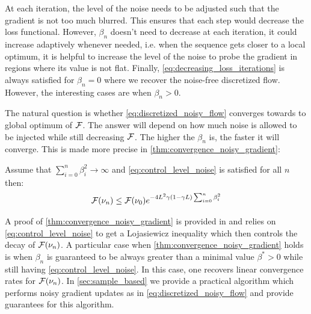 \begin{remark}
	At each iteration, the level of the noise needs to be adjusted such that the gradient is not too much blurred. This ensures that each step would decrease the loss functional. However, $\beta_n$ doesn't need to decrease at each iteration, it could increase adaptively whenever needed, i.e. when  the sequence gets closer to a local optimum, it is helpful to increase the level of the noise to probe the gradient in regions where its value is not flat.
	Finally, \cref{eq:decreasing_loss_iterations} is always satisfied for $\beta_n = 0$ where we recover the noise-free discretized flow. However, the interesting cases are when $\beta_n>0$.
 \end{remark}
The natural question is whether \cref{eq:discretized_noisy_flow} converges towards to global optimum of ${{\mathcal F}}$. The answer will depend on how much noise is allowed to be injected while still decreasing ${{\mathcal F}}$. The higher the $\beta_n$ is, the faster it will converge. This is made more precise in \cref{thm:convergence_noisy_gradient}: 
 \begin{theorem}\label{thm:convergence_noisy_gradient}
 Assume that $\sum_{i=0}^n \beta_i^2 \rightarrow \infty $ and \cref{eq:control_level_noise} is satisfied for all $n$ then:
 \begin{align}
 	{{\mathcal F}}(\nu_n)\leq {{\mathcal F}}(\nu_0) e^{-4L^2\gamma(1-\gamma L)\sum_{i=0}^n \beta^2_i}
 \end{align}
 \end{theorem}
 A proof of \cref{thm:convergence_noisy_gradient} is provided in  and relies on \cref{eq:control_level_noise} to get a Lojasiewicz inequality which then controls the decay of ${{\mathcal F}}(\nu_n)$. A particular case when \cref{thm:convergence_noisy_gradient} holds is when $\beta_n$ is guaranteed to be always greater than a minimal value $\beta^*>0$ while still having \cref{eq:control_level_noise}. In this case, one recovers linear convergence rates for ${{\mathcal F}}(\nu_n)$.
In \cref{sec:sample_based} we provide a practical algorithm which performs noisy gradient updates as in \cref{eq:discretized_noisy_flow} and provide guarantees for this algorithm.
 
 
 
